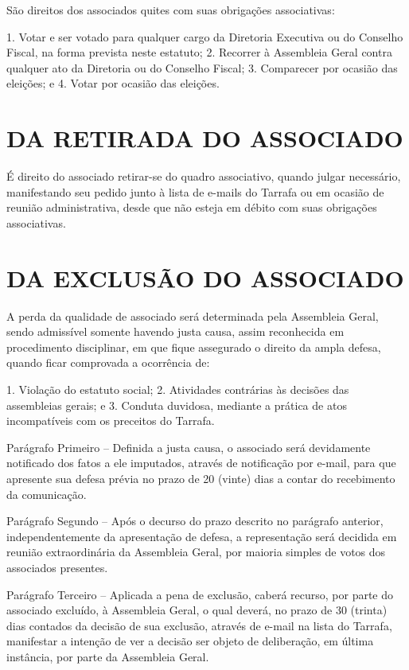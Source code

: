 \documentclass[a4paper]{report}
\begin{document}
São direitos dos associados quites com suas obrigações associativas:

1. Votar e ser votado para qualquer cargo da Diretoria Executiva ou do
   Conselho Fiscal, na forma prevista neste estatuto;
2. Recorrer à Assembleia Geral contra qualquer ato da Diretoria ou do Conselho
   Fiscal;
3. Comparecer por ocasião das eleições; e
4. Votar por ocasião das eleições.

\section{DA RETIRADA DO ASSOCIADO}

É direito do associado retirar-se do quadro associativo, quando julgar necessário,
manifestando seu pedido junto à lista de e-mails do Tarrafa ou em ocasião de reunião administrativa, desde que não
esteja em débito com suas obrigações associativas.

\section{DA EXCLUSÃO DO ASSOCIADO}

A perda da qualidade de associado será determinada pela Assembleia Geral,
sendo admissível somente havendo justa causa, assim reconhecida em
procedimento disciplinar, em que fique assegurado o direito da ampla defesa,
quando ficar comprovada a ocorrência de:

1. Violação do estatuto social;
2. Atividades contrárias às decisões das assembleias gerais; e
3. Conduta duvidosa, mediante a prática de atos incompatíveis com os preceitos
   do Tarrafa.

Parágrafo Primeiro –
Definida a justa causa, o associado será devidamente notificado dos fatos a
ele imputados, através de notificação por e-mail, para que apresente sua
defesa prévia no prazo de 20 (vinte) dias a contar do recebimento da
comunicação.

Parágrafo Segundo –
Após o decurso do prazo descrito no parágrafo anterior, independentemente da
apresentação de defesa, a representação será decidida em reunião
extraordinária da Assembleia Geral, por maioria simples de votos dos
associados presentes.

Parágrafo Terceiro –
Aplicada a pena de exclusão, caberá recurso, por parte do associado excluído,
à Assembleia Geral, o qual deverá, no prazo de 30 (trinta) dias contados da
decisão de sua exclusão, através de e-mail na lista do Tarrafa,
manifestar a intenção de ver a decisão ser objeto de deliberação, em última
instância, por parte da Assembleia Geral.
\end{document}
